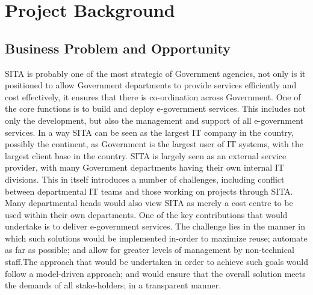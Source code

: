 \clearpage
\section{Project Background}
\subsection{Business Problem and Opportunity}
SITA is probably one of the most strategic of Government agencies, not only is it positioned to allow Government departments to provide services efficiently and cost effectively, it ensures that there is co-ordination across Government. One of the core functions is to build and deploy e-government services. This includes not only the development, but also the management and support  of all e-government services. In a way SITA can be seen as the largest IT company in the country, possibly the continent, as Government is the largest user of IT systems, with the largest client base in the country. SITA is largely seen as an external service provider, with many Government departments having their own internal IT divisions. This in itself introduces a number of challenges, including conflict between departmental IT teams and those working on projects through SITA. Many departmental heads would also view SITA as merely a cost centre to be used within their own departments. 
One of the key contributions that \client would undertake is to deliver e-government services. 
The challenge lies in the manner in which such solutions would be implemented in-order to maximize reuse; automate as far as possible; and allow for greater levels of management by non-technical staff.The approach that would be undertaken in order to achieve such goals would follow a model-driven approach;  and would  ensure that the overall solution meets the demands of all stake-holders; in a transparent manner.

